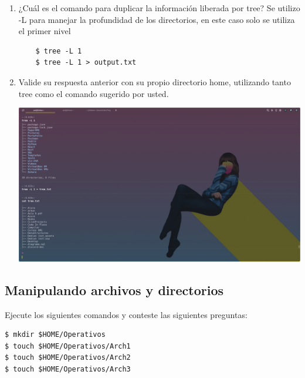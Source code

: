 \documentclass{article}
\begin{document}
\begin{enumerate}
    \item ¿Cuál es el comando para duplicar la información liberada por tree? 
    Se utilizo -L para manejar la profundidad de los directorios, en este caso solo se utiliza el primer nivel
    
    \begin{verbatim}
    $ tree -L 1
    $ tree -L 1 > output.txt
    \end{verbatim}
    
    \item Valide su respuesta anterior con su propio directorio home, utilizando tanto tree como el comando sugerido por usted.
    
    \includegraphics[scale=0.25,trim={0 0 20cm 0},clip]{LinuxCapturas/tree.png} 

\end{enumerate}

\subsection{Manipulando archivos y directorios}
Ejecute los siguientes comandos y conteste las siguientes preguntas:
\begin{verbatim}
$ mkdir $HOME/Operativos
$ touch $HOME/Operativos/Arch1
$ touch $HOME/Operativos/Arch2
$ touch $HOME/Operativos/Arch3
\end{verbatim}
\end{document}
